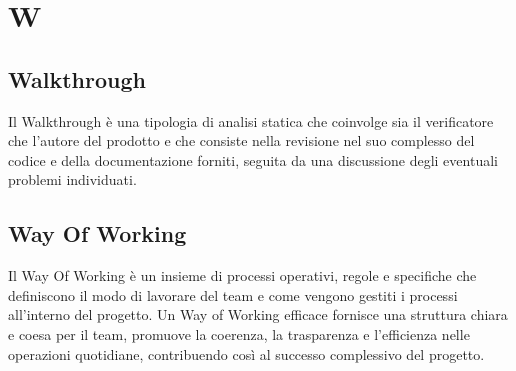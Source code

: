 \section*{W} 
\subsection*{Walkthrough} 
Il Walkthrough è una tipologia di analisi statica che coinvolge sia il verificatore che l’autore del prodotto e che consiste nella revisione nel suo complesso del codice e della documentazione forniti, seguita da una discussione degli eventuali problemi individuati.
\subsection*{Way Of Working} 
Il Way Of Working è un insieme di processi operativi, regole e specifiche che definiscono il modo di lavorare del team e come vengono gestiti i processi all'interno del progetto. Un Way of Working efficace fornisce una struttura chiara e coesa per il team, promuove la coerenza, la trasparenza e l'efficienza nelle operazioni quotidiane, contribuendo così al successo complessivo del progetto.
